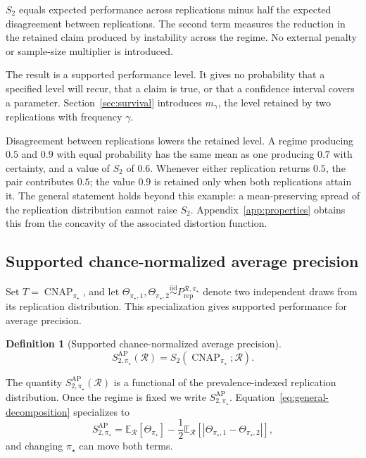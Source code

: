 \documentclass[11pt]{article}
\newcommand{\CNAP}{\operatorname{CNAP}}
\newcommand{\Regime}{\mathcal{R}}
\newcommand{\E}{\mathbb{E}}
\newcommand{\iid}{\mathrel{\overset{\mathrm{iid}}{\sim}}}
\newcommand{\SAPfull}{S_{2,\pi_\star}^{\mathrm{AP}}(\Regime)}
\newcommand{\SAP}{S_{2,\pi_\star}^{\mathrm{AP}}}
\newcommand{\PRep}{P_{\mathrm{rep}}^{\Regime,\pi_\star}}
\newtheorem{definition}{Definition}
\theoremstyle{remark}
\begin{document}
$S_2$ equals expected performance across replications minus half the expected disagreement between replications. The second term measures the reduction in the retained claim produced by instability across the regime. No external penalty or sample-size multiplier is introduced.

The result is a supported performance level. It gives no probability that a specified level will recur, that a claim is true, or that a confidence interval covers a parameter. Section~\ref{sec:survival} introduces $m_\gamma$, the level retained by two replications with frequency $\gamma$.

Disagreement between replications lowers the retained level. A regime producing $0.5$ and $0.9$ with equal probability has the same mean as one producing $0.7$ with certainty, and a value of $S_2$ of $0.6$. Whenever either replication returns $0.5$, the pair contributes $0.5$; the value $0.9$ is retained only when both replications attain it. The general statement holds beyond this example: a mean-preserving spread of the replication distribution cannot raise $S_2$. Appendix~\ref{app:properties} obtains this from the concavity of the associated distortion function.

\subsection{Supported chance-normalized average precision}

Set $T=\CNAP_{\pi_\star}$, and let $\Theta_{\pi_\star,1},\Theta_{\pi_\star,2}\iid\PRep$ denote two independent draws from its replication distribution. This specialization gives supported performance for average precision.

\begin{definition}[Supported chance-normalized average precision]
\begin{equation}
\SAPfull
=
S_2(\CNAP_{\pi_\star};\Regime).
\label{eq:rcap}
\end{equation}
\end{definition}

The quantity $\SAPfull$ is a functional of the prevalence-indexed replication distribution. Once the regime is fixed we write $\SAP$. Equation~\eqref{eq:general-decomposition} specializes to
\begin{equation}
\SAP
=
\E_{\Regime}[\Theta_{\pi_\star}]
-
\frac12
\E_{\Regime}
\left[
|\Theta_{\pi_\star,1}-\Theta_{\pi_\star,2}|
\right],
\label{eq:decomposition}
\end{equation}
and changing $\pi_\star$ can move both terms.
\end{document}
